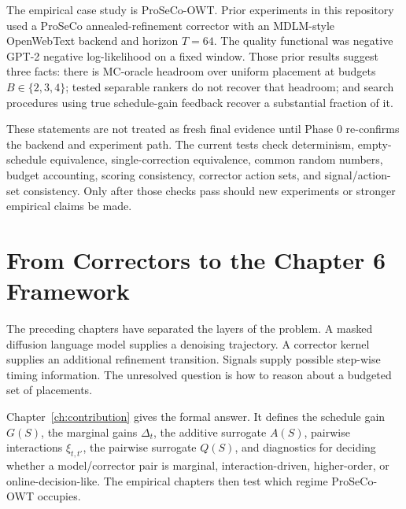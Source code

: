 The empirical case study is ProSeCo-OWT. Prior experiments in this repository
used a ProSeCo annealed-refinement corrector with an MDLM-style OpenWebText
backend and horizon $T=64$. The quality functional was negative GPT-2
negative log-likelihood on a fixed window. Those prior results suggest three
facts: there is MC-oracle headroom over uniform placement at budgets
$B\in\{2,3,4\}$; tested separable rankers do not recover that headroom; and
search procedures using true schedule-gain feedback recover a substantial
fraction of it.

These statements are not treated as fresh final evidence until Phase 0
re-confirms the backend and experiment path. The current tests check
determinism, empty-schedule equivalence, single-correction equivalence, common
random numbers, budget accounting, scoring consistency, corrector action sets,
and signal/action-set consistency. Only after those checks pass should new
experiments or stronger empirical claims be made.

\section{From Correctors to the Chapter 6 Framework}
\label{sec:ch5-to-ch6}

The preceding chapters have separated the layers of the problem. A masked
diffusion language model supplies a denoising trajectory. A corrector kernel
supplies an additional refinement transition. Signals supply possible
step-wise timing information. The unresolved question is how to reason about a
budgeted set of placements.

Chapter~\ref{ch:contribution} gives the formal answer. It defines the
schedule gain $G(S)$, the marginal gains $\Delta_t$, the additive surrogate
$A(S)$, pairwise interactions $\xi_{t,t'}$, the pairwise surrogate $Q(S)$, and
diagnostics for deciding whether a model/corrector pair is marginal,
interaction-driven, higher-order, or online-decision-like. The empirical
chapters then test which regime ProSeCo-OWT occupies.
